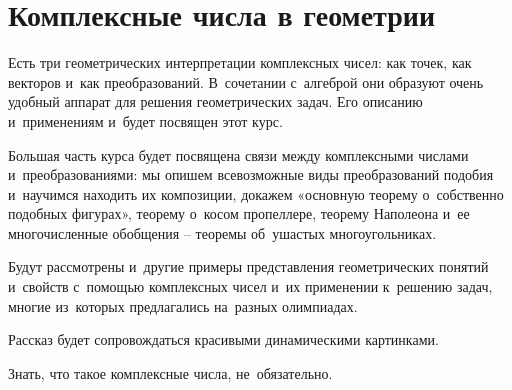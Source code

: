 
\section*{Комплексные числа в геометрии}



Есть три геометрических интерпретации комплексных чисел: как точек, как
векторов и~как преобразований.
В~сочетании с~алгеброй они образуют очень удобный аппарат для решения
геометрических задач.
Его описанию и~применениям и~будет посвящен этот курс.

Большая часть курса будет посвящена связи между комплексными числами
и~преобразованиями: мы опишем всевозможные виды преобразований подобия
и~научимся
находить их композиции, докажем «основную теорему о~собственно подобных
фигурах», теорему о~косом пропеллере, теорему Наполеона и~ее многочисленные
обобщения – теоремы об~ушастых многоугольниках.

Будут рассмотрены и~другие примеры представления геометрических понятий
и~свойств с~помощью комплексных чисел и~их применении к~решению задач, многие
из~которых предлагались на~разных олимпиадах.

Рассказ будет сопровождаться красивыми динамическими картинками.

Знать, что такое комплексные числа, не~обязательно.

